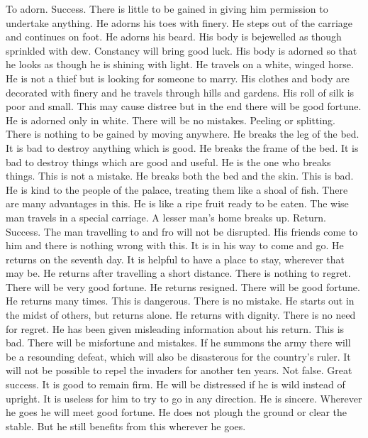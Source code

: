 	{To adorn. Success. There is little to be gained in giving him permission to undertake anything.}
	{He adorns his toes with finery. He steps out of the carriage and continues on foot.}
	{He adorns his beard.}
	{His body is bejewelled as though sprinkled with dew. Constancy will bring good luck.}
	{His body is adorned so that he looks as though he is shining with light. He travels on a white, winged
		horse. He is not a thief but is looking for someone to marry.}
	{His clothes and body are decorated with finery and he travels through hills and gardens. His roll
		of silk is poor and small. This may cause distree but in the end there will be good fortune.}
	{He is adorned only in white. There will be no mistakes.}
\or {}
	{Peeling or splitting. There is nothing to be gained by moving anywhere.}
	{He breaks the leg of the bed. It is bad to destroy anything which is good.}
	{He breaks the frame of the bed. It is bad to destroy things which are good and useful.}
	{He is the one who breaks things. This is not a mistake.}
	{He breaks both the bed and the skin. This is bad.}
	{He is kind to the people of the palace, treating them like a shoal of fish. There are many advantages
		in this.}
	{He is like a ripe fruit ready to be eaten. The wise man travels in a special carriage. A lesser man's
		home breaks up.}
\or {}
	{Return. Success. The man travelling to and fro will not be disrupted. His friends come to him and there is
		nothing wrong with this. It is in his way to come and go. He returns on the seventh day. It
		is helpful to have a place to stay, wherever that may be.}
	{He returns after travelling a short distance. There is nothing to regret. There will be very good fortune.}
	{He returns resigned. There will be good fortune.}
	{He returns many times. This is dangerous. There is no mistake.}
	{He starts out in the midst of others, but returns alone.}
	{He returns with dignity. There is no need for regret.}
	{He has been given misleading information about his return. This is bad. There will be misfortune and
		mistakes. If he summons the army there will be a resounding defeat, which will also be disasterous
		for the country's ruler. It will not be possible to repel the invaders for another ten years.}
\or {}
	{Not false. Great success. It is good to remain firm. He will be distressed if he is wild instead of
		upright. It is useless for him to try to go in any direction.}
	{He is sincere. Wherever he goes he will meet good fortune.}
	{He does not plough the ground or clear the stable. But he still benefits from this wherever he goes.}
